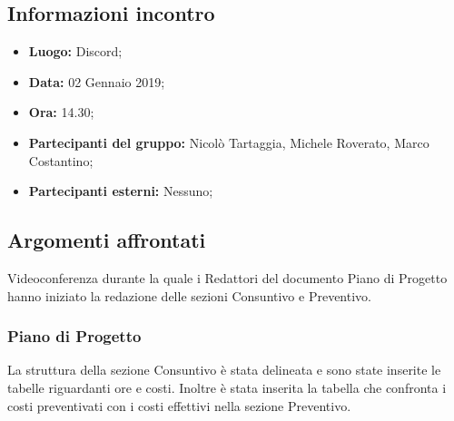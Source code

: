 \subsection{Informazioni incontro}
\begin{itemize}
	\item { \textbf{Luogo:} Discord;  }
	\item { \textbf{Data:} 02 Gennaio 2019; }
	\item { \textbf{Ora:} 14.30; }
	\item { \textbf{Partecipanti del gruppo:} Nicolò Tartaggia, Michele Roverato, Marco Costantino;}
	\item { \textbf{Partecipanti esterni:} Nessuno; }
\end{itemize}


\subsection{Argomenti affrontati}
Videoconferenza durante la quale i Redattori del documento Piano di Progetto hanno iniziato la redazione delle sezioni Consuntivo e Preventivo.

\subsubsection{Piano di Progetto}
La struttura della sezione Consuntivo è stata delineata e sono state inserite le tabelle riguardanti ore e costi. Inoltre è stata inserita la tabella che confronta i costi preventivati con i costi effettivi nella sezione Preventivo.